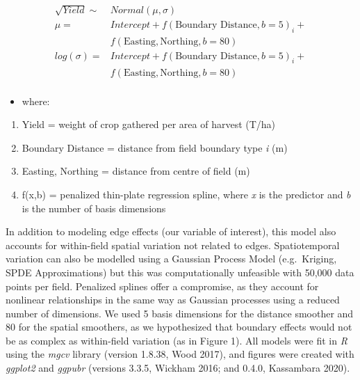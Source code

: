 \documentclass[]{elsarticle} %
\providecommand{\tightlist}{%
  \setlength{\itemsep}{0pt}\setlength{\parskip}{0pt}}
\begin{document}
\begin{equation}
  \begin{split}
  \sqrt{Yield} \sim & Normal (\mu, \sigma)\\
  \mu = & Intercept + f(\text{Boundary Distance}, b=5)_i + \\
   & f(\text{Easting}, \text{Northing}, b=80)\\
  log(\sigma) =  & Intercept + f(\text{Boundary Distance}, b=5)_i + \\
   & f(\text{Easting}, \text{Northing}, b=80)\\
  \end{split}
  \end{equation}

\begin{itemize}
\tightlist
\item
  where:
\end{itemize}

\begin{enumerate}
\def\labelenumi{\arabic{enumi}.}
\tightlist
\item
  Yield = weight of crop gathered per area of harvest (T/ha)
\item
  Boundary Distance = distance from field boundary type \emph{i} (m)
\item
  Easting, Northing = distance from centre of field (m)
\item
  f(x,b) = penalized thin-plate regression spline, where \emph{x} is the predictor and \emph{b} is the number of basis dimensions
\end{enumerate}

In addition to modeling edge effects (our variable of interest), this model also accounts for within-field spatial variation not related to edges.
Spatiotemporal variation can also be modelled using a Gaussian Process Model (e.g.~Kriging, SPDE Approximations) but this was computationally unfeasible with 50,000 data points per field.
Penalized splines offer a compromise, as they account for nonlinear relationships in the same way as Gaussian processes using a reduced number of dimensions.
We used 5 basis dimensions for the distance smoother and 80 for the spatial smoothers, as we hypothesized that boundary effects would not be as complex as within-field variation (as in Figure 1).
All models were fit in \emph{R} using the \emph{mgcv} library (version 1.8.38, Wood 2017), and figures were created with \emph{ggplot2} and \emph{ggpubr} (versions 3.3.5, Wickham 2016; and 0.4.0, Kassambara 2020).
\end{document}
